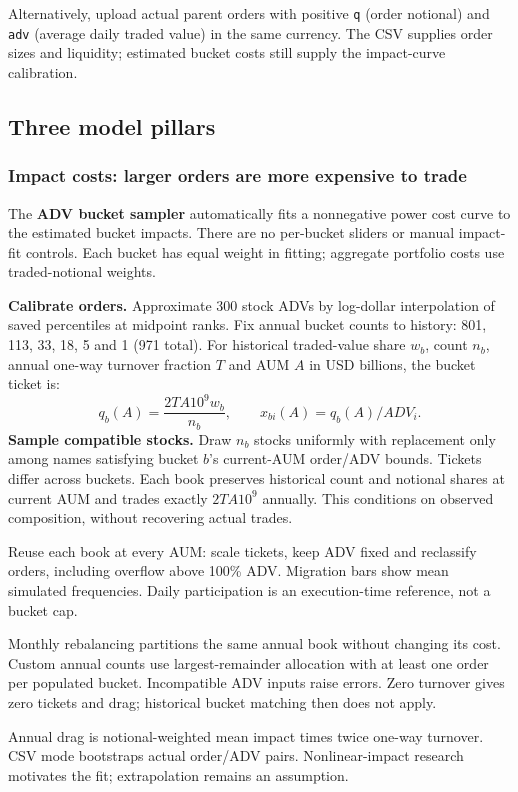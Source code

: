 \documentclass[11pt,a4paper]{article}
\begin{document}
Alternatively, upload actual parent orders with positive \texttt{q} (order notional) and \texttt{adv} (average daily traded value) in the same currency. The CSV supplies order sizes and liquidity; estimated bucket costs still supply the impact-curve calibration.

\subsection{Three model pillars}
\subsubsection{Impact costs: larger orders are more expensive to trade}
{\small
The \textbf{ADV bucket sampler} automatically fits a nonnegative power cost curve to the estimated bucket impacts. There are no per-bucket sliders or manual impact-fit controls. Each bucket has equal weight in fitting; aggregate portfolio costs use traded-notional weights.

\textbf{Calibrate orders.} Approximate 300 stock ADVs by log-dollar interpolation of saved percentiles at midpoint ranks. Fix annual bucket counts to history: 801, 113, 33, 18, 5 and 1 (971 total). For historical traded-value share $w_b$, count $n_b$, annual one-way turnover fraction $T$ and AUM $A$ in USD billions, the bucket ticket is:
\[
q_b(A)=\frac{2TA10^9w_b}{n_b},\qquad x_{bi}(A)=q_b(A)/ADV_i.
\]
\textbf{Sample compatible stocks.} Draw $n_b$ stocks uniformly with replacement only among names satisfying bucket $b$'s current-AUM order/ADV bounds. Tickets differ across buckets. Each book preserves historical count and notional shares at current AUM and trades exactly $2TA10^9$ annually. This conditions on observed composition, without recovering actual trades.

Reuse each book at every AUM: scale tickets, keep ADV fixed and reclassify orders, including overflow above 100\% ADV. Migration bars show mean simulated frequencies. Daily participation is an execution-time reference, not a bucket cap.

Monthly rebalancing partitions the same annual book without changing its cost. Custom annual counts use largest-remainder allocation with at least one order per populated bucket. Incompatible ADV inputs raise errors. Zero turnover gives zero tickets and drag; historical bucket matching then does not apply.

Annual drag is notional-weighted mean impact times twice one-way turnover. CSV mode bootstraps actual order/ADV pairs. Nonlinear-impact research~\cite{almgren} motivates the fit; extrapolation remains an assumption.
}
\end{document}
